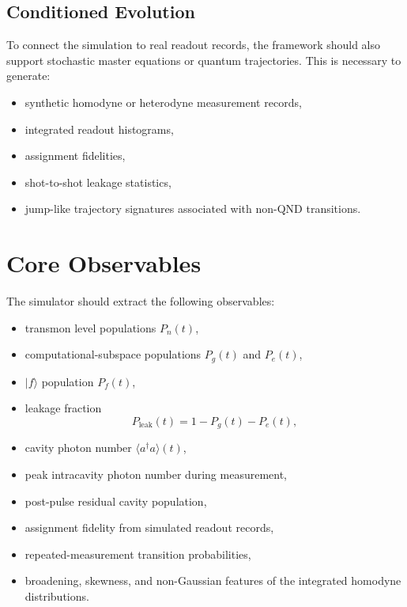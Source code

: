 \documentclass[11pt]{article}
\begin{document}
\subsection{Conditioned Evolution}

To connect the simulation to real readout records, the framework should also support
stochastic master equations or quantum trajectories. This is necessary to generate:
\begin{itemize}[leftmargin=2em]
    \item synthetic homodyne or heterodyne measurement records,
    \item integrated readout histograms,
    \item assignment fidelities,
    \item shot-to-shot leakage statistics,
    \item jump-like trajectory signatures associated with non-QND transitions.
\end{itemize}

\section{Core Observables}

The simulator should extract the following observables:
\begin{itemize}[leftmargin=2em]
    \item transmon level populations $P_n(t)$,
    \item computational-subspace populations $P_g(t)$ and $P_e(t)$,
    \item $|f\rangle$ population $P_f(t)$,
    \item leakage fraction
    \begin{equation}
        P_{\mathrm{leak}}(t)=1-P_g(t)-P_e(t),
    \end{equation}
    \item cavity photon number $\langle a^\dagger a \rangle(t)$,
    \item peak intracavity photon number during measurement,
    \item post-pulse residual cavity population,
    \item assignment fidelity from simulated readout records,
    \item repeated-measurement transition probabilities,
    \item broadening, skewness, and non-Gaussian features of the integrated homodyne
    distributions.
\end{itemize}
\end{document}
